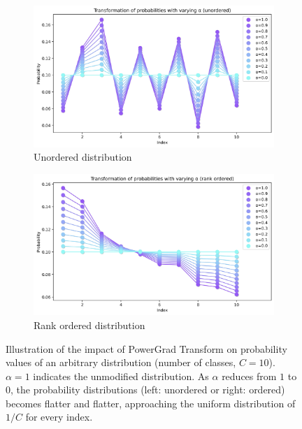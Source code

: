 \documentclass[times,sort&compress]{elsarticle}
\begin{document}
\begin{figure}[t]
\centering
\begin{subfigure}{.5\columnwidth}
\centering
\includegraphics[width=0.96\columnwidth]{prob_transform_unordered}
\caption{Unordered distribution}
\end{subfigure}%
\begin{subfigure}{.5\columnwidth}
\centering
\includegraphics[width=0.96\columnwidth]{prob_transform_ordered}
\caption{Rank ordered distribution}
\end{subfigure}
\caption{ Illustration of the impact of PowerGrad Transform on probability values of an
arbitrary distribution (number of classes, $C=10$). $\alpha=1$ indicates the unmodified
distribution. As $\alpha$ reduces from $1$ to $0$, the probability distributions (left:
unordered or right: ordered) becomes flatter and flatter, approaching the uniform
distribution of $1/C$ for every index. }
\label{fig:prob_plots}
\end{figure}
\end{document}
